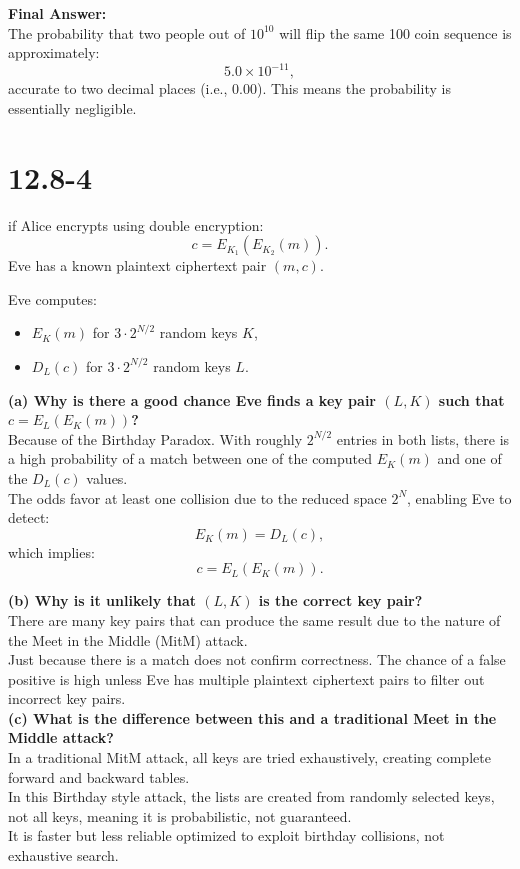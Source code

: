 \documentclass[12pt]{article}
\begin{document}
\textbf{Final Answer:} \\
The probability that two people out of \( 10^{10} \) will flip the same 100 coin sequence is approximately:
\[
5.0 \times 10^{-11},
\]
accurate to two decimal places (i.e., 0.00). This means the probability is essentially negligible.
\newpage
\section*{12.8-4}
if Alice encrypts using double encryption:
\[
c = E_{K_1}(E_{K_2}(m)).
\]
Eve has a known plaintext ciphertext pair \( (m, c) \).

Eve computes:
\begin{itemize}
    \item \( E_K(m) \) for \( 3 \cdot 2^{N/2} \) random keys \( K \),
    \item \( D_L(c) \) for \( 3 \cdot 2^{N/2} \) random keys \( L \).
\end{itemize}

\textbf{(a) Why is there a good chance Eve finds a key pair \( (L, K) \) such that \( c = E_L(E_K(m)) \)?} \\
Because of the Birthday Paradox. With roughly \( 2^{N/2} \) entries in both lists, there is a high probability of a match between one of the computed \( E_K(m) \) and one of the \( D_L(c) \) values. \\
The odds favor at least one collision due to the reduced space \( 2^N \), enabling Eve to detect:
\[
E_K(m) = D_L(c),
\]
which implies:
\[
c = E_L(E_K(m)).
\]

\textbf{(b) Why is it unlikely that \( (L, K) \) is the correct key pair?} \\
There are many key pairs that can produce the same result due to the nature of the Meet in the Middle (MitM) attack. \\
Just because there is a match does not confirm correctness. The chance of a false positive is high unless Eve has multiple plaintext ciphertext pairs to filter out incorrect key pairs.\\

\textbf{(c) What is the difference between this and a traditional Meet in the Middle attack?} \\
In a traditional MitM attack, all keys are tried exhaustively, creating complete forward and backward tables. \\
In this Birthday style attack, the lists are created from randomly selected keys, not all keys, meaning it is probabilistic, not guaranteed. \\
It is faster but less reliable optimized to exploit birthday collisions, not exhaustive search.
\newpage
\end{document}
